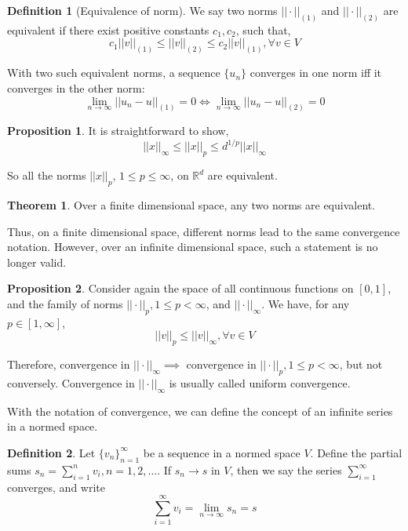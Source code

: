 \documentclass{article}
\theoremstyle{definition}
\newtheorem{definition}{Definition}[section]
\newtheorem{theorem}{Theorem}[section]
\newtheorem{proposition}{Proposition}[section]
\begin{document}
\begin{definition}[Equivalence of norm]
We say two norms $||\cdot||_{(1)}$ and $||\cdot ||_{(2)}$ are equivalent if there exist positive constants $c_1,c_2$, such that,
\begin{equation}
c_1||v||_{(1)}\leq ||v||_{(2)} \leq c_2||v||_{(1)}, \forall v \in V
\end{equation}
\end{definition}

With two such equivalent norms, a sequence $\{u_n\}$ converges in one norm iff it converges in the other norm:
\begin{equation}
\lim_{n \to \infty} ||u_n-u||_{(1)}=0 \iff \lim_{n\to \infty} ||u_n-u||_{(2)}=0
\end{equation}

\begin{proposition}
It is straightforward to show,
\begin{equation}
||x||_{\infty}\leq ||x||_p \leq d^{1/p}||x||_{\infty}
\end{equation}
\end{proposition}
So all the norms $||x||_p$, $1\leq p \leq \infty$, on $\mathbb{R}^d$ are equivalent.


\begin{theorem}
Over a finite dimensional space, any two norms are equivalent. 
\end{theorem}
Thus, on a finite dimensional space, different norms lead to the same convergence notation. However, over an infinite dimensional space, such a statement is no longer valid.


\begin{proposition}
Consider again the space of all continuous functions on $[0,1]$, and the family of norms $||\cdot||_p, 1\leq p <\infty$, and $||\cdot||_{\infty}$. We have, for any $p \in [1,\infty]$,
\begin{equation}
||v||_p \leq ||v||_{\infty}, \forall v \in V
\end{equation}

Therefore, convergence in $||\cdot||_{\infty} \implies$ convergence in $||\cdot||_{p}, 1\leq p < \infty$, but not conversely. Convergence in $||\cdot||_{\infty}$ is usually called uniform convergence.

\end{proposition}

With the notation of convergence, we can define the concept of an infinite series in a normed space.

\begin{definition}
Let $\{v_n\}_{n=1}^{\infty}$ be a sequence in a normed space $V$. Define the partial sums $s_n=\sum_{i=1}^{n} v_i,n=1,2,\ldots$. If $s_n \to s$ in $V$, then we say the series $\sum_{i=1}^{\infty}$ converges, and write
\begin{equation}
\sum_{i=1}^{\infty} v_i=\lim_{n\to \infty} s_n=s
\end{equation}
\end{definition}
\end{document}
